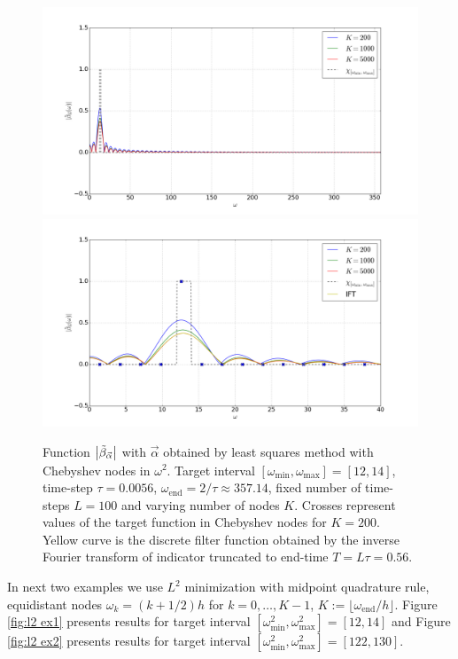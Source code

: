 \documentclass[a4paper,11pt,bibliography=totoc,listof=totoc,headinclude=true,cleardoublepage=empty,oneside]{scrbook}
\newcommand{\dffv}{\Tilde{\beta}_{\Vec{\alpha}}}
\newcommand{\e}{\mathrm{end}}
\begin{document}
\begin{figure}
    \centering
    \includegraphics[width=1\linewidth]{latex//images//cheb_least_sq/Figure_1.png}
    \includegraphics[width=1\linewidth]{latex//images//cheb_least_sq/Figure_2.png}
    \caption{Function $\left|\dffv\right|$ with $\Vec{\alpha}$ obtained by least squares method with Chebyshev nodes in $\omega^2$. Target interval $\left[\omega_{\min}, \omega_{\max} \right] = [12, 14]$, time-step $\tau = 0.0056$, $\omega_\e = 2/\tau \approx 357.14$, fixed number of time-steps $L=100$ and varying number of nodes $K$. Crosses represent values of the target function in Chebyshev nodes for $K=200$. Yellow curve is the discrete filter function obtained by the inverse Fourier transform of indicator truncated to end-time $T=L\tau = 0.56$.}
    \label{fig:cheb least sq}
\end{figure}

In next two examples we use $L^2$ minimization with midpoint quadrature rule, equidistant nodes $\omega_k = (k+1/2)h$ for $k=0,\dots, K-1$, $K:= \lfloor\omega_\e/h\rfloor$. Figure \ref{fig:l2 ex1} presents results for target interval $\left[\omega_{\min}^2, \omega_{\max}^2\right] = [12, 14]$ and Figure \ref{fig:l2 ex2} presents results for target interval $\left[\omega_{\min}^2, \omega_{\max}^2\right] = [122, 130]$. 
\end{document}
